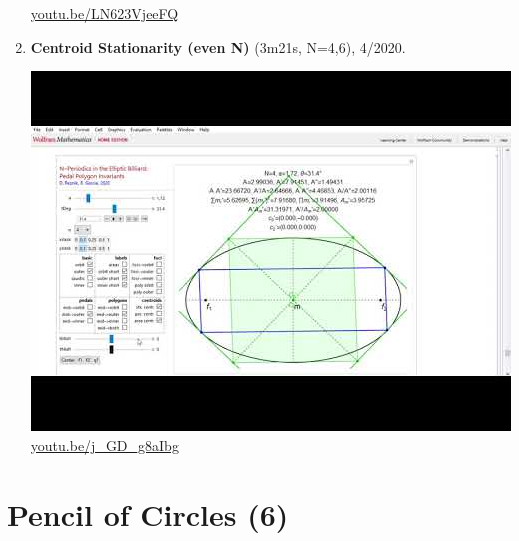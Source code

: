 \documentclass[12pt]{amsart}
\begin{document}
\begin{enumerate}[resume]
\begin{center}
\href{https://youtu.be/LN623VjeeFQ}{\url{youtu.be/LN623VjeeFQ}}\end{center}
% 
\item \textbf{Centroid Stationarity (even N)} (3m21s, N=4,6), 4/2020. 
\begin{center}\includegraphics[width=.5\textwidth]{pics/j_GD_g8aIbg.jpg} \\ 
\href{https://youtu.be/j_GD_g8aIbg}{\url{youtu.be/j\_GD\_g8aIbg}}\end{center}
% 
\end{enumerate}

\section{Pencil of Circles (6)}
\end{document}
